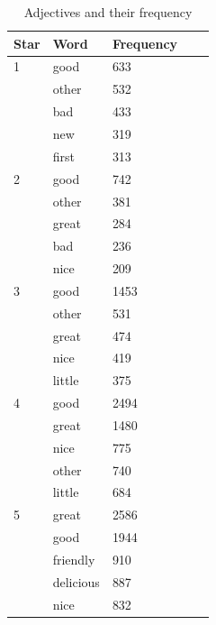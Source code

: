 \documentclass[sigconf]{acmart}
\begin{document}
\begin{table}
  \caption{Adjectives and their frequency}
  \label{tab:adj1}
  \begin{tabular}{lllll}
    \toprule
    Star & Word & Frequency \\
    \midrule
    1 & good & 633 \\
    & other & 532 \\
    & bad & 433 \\
    & new & 319 \\
    & first & 313 \\
    2 & good & 742 \\
    & other & 381 \\
    & great & 284 \\ 
    & bad & 236 \\
    & nice & 209 \\
    3 & good & 1453\\
    & other & 531 \\
    & great & 474 \\ 
    & nice & 419 \\ 
    & little & 375 \\
    4 & good & 2494 \\
    & great & 1480 \\ 
    & nice & 775 \\
    & other & 740 \\
    & little & 684 \\
    5 & great & 2586\\
    & good & 1944\\
    & friendly & 910\\
    & delicious & 887\\
    & nice & 832 \\
\end{tabular}
\end{table}
\end{document}

